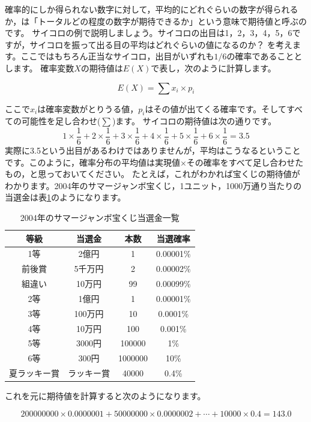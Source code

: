 確率的にしか得られない数字に対して，平均的にどれぐらいの数字が得られるか，は「トータルどの程度の数字が期待できるか」という意味で期待値と呼ぶのです。
サイコロの例で説明しましょう。サイコロの出目は1，2，3，4，5，6ですが，サイコロを振って出る目の平均はどれぐらいの値になるのか？ を考えます。ここではもちろん正当なサイコロ，出目がいずれも$1/6$の確率であることとします。
確率変数$X$の期待値は$E(X)$で表し，次のように計算します。

\[ E(X) = \sum x_i \times p_i \]

ここで$x_i$は確率変数がとりうる値，$p_i$はその値が出てくる確率です。そしてすべての可能性を足し合わせ($\sum$)ます。
サイコロの期待値は次の通りです。
\[1\times\frac{1}{6}+
	2\times\frac{1}{6}+
	3\times\frac{1}{6}+
	4\times\frac{1}{6}+
	5\times\frac{1}{6}+
	6\times\frac{1}{6}
	=3.5\]
実際に3.5という出目があるわけではありませんが，平均はこうなるということです。このように，確率分布の平均値は実現値$\times$その確率をすべて足し合わせたもの，と思っておいてください。
たとえば，これがわかれば宝くじの期待値がわかります。2004年のサマージャンボ宝くじ，1ユニット，1000万通り当たりの当選金は表\ref{takarakuji}のようになります。


\begin{table}[hb]
	\centering
	\caption{2004年のサマージャンボ宝くじ当選金一覧}
	\begin{tabular}{cccc}
		等級     & 当選金   & 本数      & 当選確率      \\\hline
		1等     & 2億円   & 1       & 0.00001\% \\
		前後賞    & 5千万円  & 2       & 0.00002\% \\
		組違い    & 10万円  & 99      & 0.00099\% \\
		2等     & 1億円   & 1       & 0.00001\% \\
		3等     & 100万円 & 10      & 0.0001\%  \\
		4等     & 10万円  & 100     & 0.001\%   \\
		5等     & 3000円 & 100000  & 1\%       \\
		6等     & 300円  & 1000000 & 10\%      \\
		夏ラッキー賞 & ラッキー賞 & 40000   & 0.4\%     \\
	\end{tabular}
	\label{takarakuji}
\end{table}
これを元に期待値を計算すると次のようになります。

\[200000000 \times 0.0000001 + 50000000 \times 0.0000002 + \cdots + 10000\times0.4=143.0 \]

